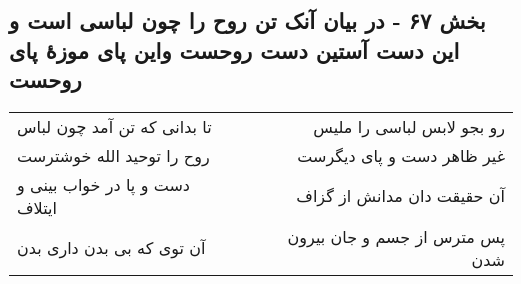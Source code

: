 \begin{center}
\section*{بخش ۶۷ - در بیان آنک تن روح را چون لباسی است و این دست آستین دست روحست واین پای  موزهٔ پای روحست}
\label{sec:sh067}
\begin{longtable}{l p{0.5cm} r}
تا بدانی که تن آمد چون لباس
&&
رو بجو لابس لباسی را ملیس
\\
روح را توحید الله خوشترست
&&
غیر ظاهر دست و پای دیگرست
\\
دست و پا در خواب بینی و ایتلاف
&&
آن حقیقت دان مدانش از گزاف
\\
آن توی که بی بدن داری بدن
&&
پس مترس از جسم و جان بیرون شدن
\\
\end{longtable}
\end{center}
